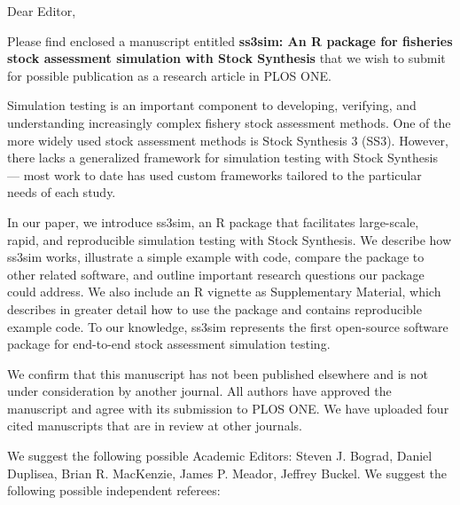\documentclass[letterpaper,11pt]{letter}
\begin{document}
\begin{letter}{}
\pagestyle{empty}
\opening{Dear Editor,}


Please find enclosed a manuscript entitled \textbf{ss3sim: An R package for
fisheries stock assessment simulation with Stock Synthesis} that we wish to
submit for possible publication as a research article in PLOS ONE.

Simulation testing is an important component to developing, verifying, and
understanding increasingly complex fishery stock assessment methods. One of the
more widely used stock assessment methods is Stock Synthesis 3 (SS3). However,
there lacks a generalized framework for simulation testing with Stock Synthesis
--- most work to date has used custom frameworks tailored to the particular
needs of each study.

In our paper, we introduce ss3sim, an R package that facilitates large-scale,
rapid, and reproducible simulation testing with Stock Synthesis. We describe
how ss3sim works, illustrate a simple example with code, compare the package to
other related software, and outline important research questions our package
could address. We also include an R vignette as Supplementary Material, which
describes in greater detail how to use the package and contains reproducible
example code. To our knowledge, ss3sim represents the first open-source
software package for end-to-end stock assessment simulation testing.

We confirm that this manuscript has not been published elsewhere and is not
under consideration by another journal. All authors have approved the
manuscript and agree with its submission to PLOS ONE. We have uploaded four
cited manuscripts that are in review at other journals.

We suggest the following possible Academic Editors:
Steven J. Bograd,
Daniel Duplisea,
Brian R. MacKenzie,
James P. Meador,
Jeffrey Buckel.
We suggest the following possible independent referees:


\end{letter}
\end{document}
